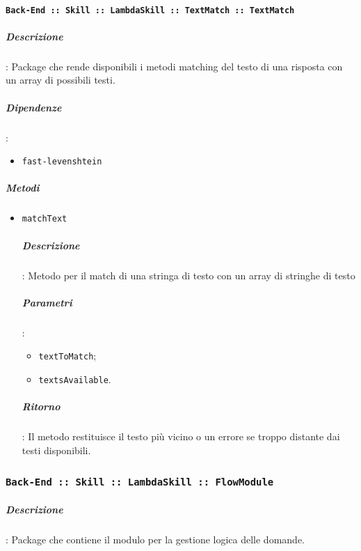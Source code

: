 \documentclass[../DefinizioneDiProdotto_v3.0.0.tex]{subfiles}
\begin{document}
\paragraph{\texttt{Back-End :: Skill :: LambdaSkill :: TextMatch :: TextMatch}}
\subparagraph{Descrizione}: Package che rende disponibili i metodi matching del testo di una risposta con un array di possibili testi.
\subparagraph{Dipendenze}: \begin{itemize}
\item \texttt{fast-levenshtein}
\end{itemize}
\subparagraph{Metodi}
\begin{itemize}
	\item \texttt{matchText}
	      \subparagraph{Descrizione}: Metodo per il match di una stringa di testo con un array di stringhe di testo
	      \subparagraph{Parametri}:
	      \begin{itemize}
	      	\item \texttt{textToMatch};
	      	\item \texttt{textsAvailable}.
	      \end{itemize}
	      \subparagraph{Ritorno}: Il metodo restituisce il testo più vicino o un errore se troppo distante dai testi disponibili.
\end{itemize}

\subsubsection{\texttt{Back-End :: Skill :: LambdaSkill :: FlowModule}}
\subparagraph{Descrizione}:
Package che contiene il modulo per la gestione logica delle domande.
\end{document}
